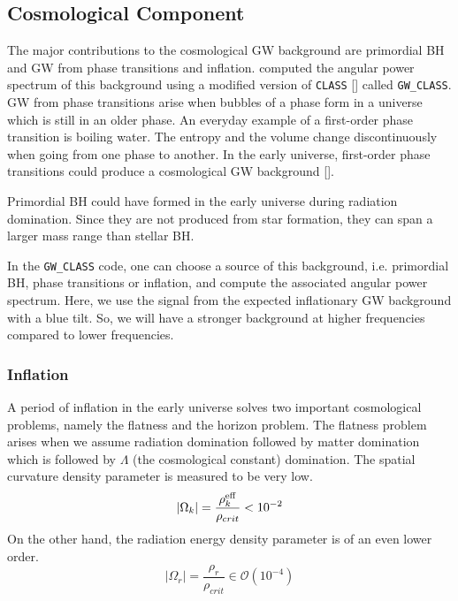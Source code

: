 \subsection{Cosmological Component}
\label{cosmo_bg}
The major contributions to the cosmological GW background are primordial BH and GW from phase transitions and inflation. \cite{schulze_gw_class_2023} computed the angular power spectrum of this background using a modified version of {\tt CLASS} [\cite{blas_cosmic_2011}] called {\tt GW\_CLASS}.
GW from phase transitions arise when bubbles of a phase form in a universe which is still in an older phase. An everyday example of a first-order phase transition is boiling water. The entropy and the volume change discontinuously when going from one phase to another. In the early universe, first-order phase transitions could produce a cosmological GW background [\cite{christensen_stochastic_2019}]. 

Primordial BH could have formed in the early universe during radiation domination. Since they are not produced from star formation, they can span a larger mass range than stellar BH. 

In the {\tt GW\_CLASS} code, one can choose a source of this background, i.e. primordial BH, phase transitions or inflation, and compute the associated angular power spectrum. Here, we use the signal from the expected inflationary GW background with a blue tilt. So, we will have a stronger background at higher frequencies compared to lower frequencies. 

\subsubsection{Inflation}

A period of inflation in the early universe solves two important cosmological problems, namely the flatness and the horizon problem. The flatness problem arises when we assume radiation domination followed by matter domination which is followed by $\Lambda$ (the cosmological constant) domination. The spatial curvature density parameter is measured to be very low. 
\begin{equation}
    |\Omega_k| = \frac{\rho_k^{\rm{eff}}}{\rho_{crit}} < 10^{-2}
\end{equation} 
On the other hand, the radiation energy density parameter is of an even lower order.
\begin{equation}
    |\Omega_r| = \frac{\rho_r}{\rho_{crit}} \in \mathcal{O}(10^{-4}) 
\end{equation}

